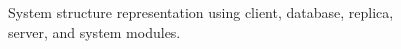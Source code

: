 \documentclass[twoside, a4paper, titlepage]{article}
\begin{document}
\begin{figure}[H]
\begin{tikzpicture}[scale = 0.5, every node/.style={scale = 0.75}]
  \end{tikzpicture}
  \caption{
    System structure representation using client, database, replica, server, and system modules.
  }
\end{figure}

\end{document}
